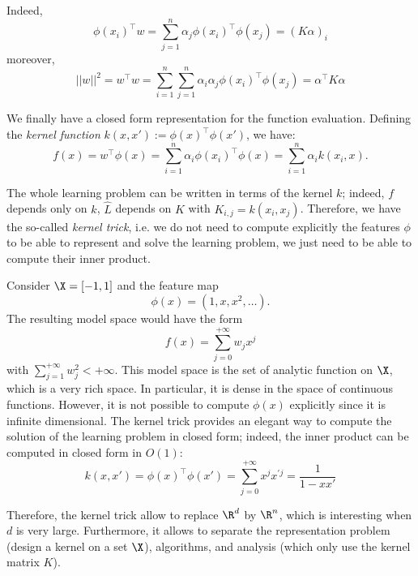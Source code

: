 \documentclass[toc]{../cs-classes/cs-classes}
\begin{document}
Indeed,
\begin{equation*}
    \phi(x_i)^\top w = \sum_{j=1}^n \alpha_j\phi(x_i)^\top\phi(x_j) = (K\alpha)_i
\end{equation*}
moreover,
\begin{equation*}
    ||w||^2 = w^\top w = \sum_{i=1}^n\sum_{j=1}^n \alpha_i\alpha_j\phi(x_i)^\top\phi(x_j) = \alpha^\top K\alpha
\end{equation*}

We finally have a closed form representation for the function evaluation. Defining the \emph{kernel function} $k(x, x'):=\phi(x)^\top \phi(x')$, we have:
\begin{equation*}
    f(x) = w^\top\phi(x) = \sum_{i=1}^n \alpha_i\phi(x_i)^\top\phi(x) = \sum_{i=1}^n \alpha_i k(x_i, x).
\end{equation*}

\begin{remark}
    The whole learning problem can be written in terms of the kernel $k$; indeed, $f$ depends only on $k$, $\hat{L}$ depends on $K$ with $K_{i, j} = k(x_i, x_j)$. Therefore, we have the so-called \emph{kernel trick}, i.e. we do not need to compute explicitly the features $\phi$ to be able to represent and solve the learning problem, we just need to be able to compute their inner product.
\end{remark}

\begin{example}
    \leavevmode
    
    \noindent
    Consider $\X=\lbrack-1, 1\rbrack$ and the feature map
    \begin{equation*}
        \phi(x)=(1, x, x^2, \dots).
    \end{equation*}
    The resulting model space would have the form
    \begin{equation*}
        f(x)=\sum_{j=0}^{+\infty}w_jx^j
    \end{equation*}
    with $\sum_{j=1}^{+\infty}w_j^2 < +\infty$. This model space is the set of analytic function on $\X$, which is a very rich space. In particular, it is dense in the space of continuous functions. However, it is not possible to compute $\phi(x)$ explicitly since it is infinite dimensional. The kernel trick provides an elegant way to compute the solution of the learning problem in closed form; indeed, the inner product can be computed in closed form in $O(1)$:
    \begin{equation*}
        k(x, x') = \phi(x)^\top\phi(x')=\sum_{j=0}^{+\infty}x^jx^{'j} = \frac{1}{1-xx'}
    \end{equation*}

    Therefore, the kernel trick allow to replace $\R^d$ by $\R^n$, which is interesting when $d$ is very large. Furthermore, it allows to separate the representation problem (design a kernel on a set $\X$), algorithms, and analysis (which only use the kernel matrix $K$).
\end{example}
\end{document}
